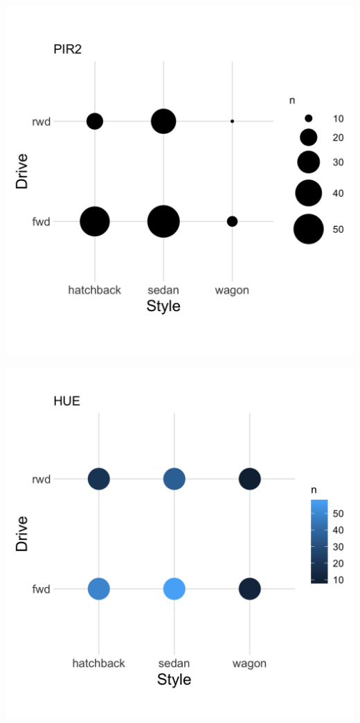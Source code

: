 \documentclass[]{article}
\newcommand{\setwidth}{0.40\textwidth}
\begin{document}
\noindent\hrulefill

\hspace*{\fill}
\begin{minipage}{\setwidth}
  \centering
  \includegraphics[width=1.00\textwidth]{../images/05_area}
\end{minipage} %
\hfill\vline\hfill
\begin{minipage}{\setwidth}
  \centering
  \includegraphics[width=1.00\textwidth]{../images/06_hue}
\end{minipage}
\hspace*{\fill}
%
\end{document}
